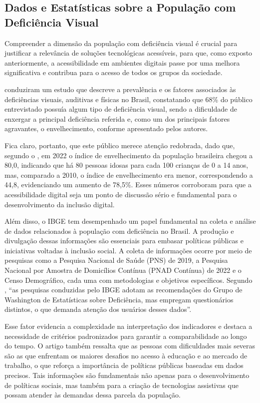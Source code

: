 \subsection{Dados e Estatísticas sobre a População com Deficiência Visual}

Compreender a dimensão da população com deficiência visual é crucial para justificar a relevância de soluções tecnológicas acessíveis, para que, como exposto anteriormente, a acessibilidade em ambientes digitais passe por uma melhora significativa e contribua para o acesso de todos os grupos da sociedade.

 conduziram um estudo que descreve a prevalência e os fatores associados às deficiências visuais, auditivas e físicas no Brasil, constatando que 68\% do público entrevistado possuía algum tipo de deficiência visual, sendo a dificuldade de enxergar a principal deficiência referida e, como um dos principais fatores agravantes, o envelhecimento, conforme apresentado pelos autores. 

Fica claro, portanto, que este público merece atenção redobrada, dado que, segundo o , em 2022 o índice de envelhecimento da população brasileira chegou a 80,0, indicando que há 80 pessoas idosas para cada 100 crianças de 0 a 14 anos, mas, comparado a 2010, o índice de envelhecimento era menor, correspondendo a 44,8, evidenciando um aumento de 78,5\%. Esses números corroboram para que a acessibilidade digital seja um ponto de discussão sério e fundamental para o desenvolvimento da inclusão digital.

Além disso, o IBGE tem desempenhado um papel fundamental na coleta e análise de dados relacionados à população com deficiência no Brasil. A produção e divulgação dessas informações são essenciais para embasar políticas públicas e iniciativas voltadas à inclusão social. A coleta de informações ocorre por meio de pesquisas como a Pesquisa Nacional de Saúde (PNS) de 2019, a Pesquisa Nacional por Amostra de Domicílios Contínua (PNAD Contínua) de 2022 e o Censo Demográfico, cada uma com metodologias e objetivos específicos. Segundo , “as pesquisas conduzidas pelo IBGE adotam as recomendações do Grupo de Washington de Estatísticas sobre Deficiência, mas empregam questionários distintos, o que demanda atenção dos usuários desses dados”. 

Esse fator evidencia a complexidade na interpretação dos indicadores e destaca a necessidade de critérios padronizados para garantir a comparabilidade ao longo do tempo. O artigo também ressalta que as pessoas com dificuldades mais severas são as que enfrentam os maiores desafios no acesso à educação e ao mercado de trabalho, o que reforça a importância de políticas públicas baseadas em dados precisos. Tais informações são fundamentais não apenas para o desenvolvimento de políticas sociais, mas também para a criação de tecnologias assistivas que possam atender às demandas dessa parcela da população.

